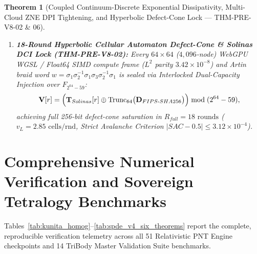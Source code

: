 \documentclass[11pt,a4paper,reqno]{article}
\def\bm#1{#1}%
\def\texttt#1{#1}%
\def\mathrm#1{#1}%
\def\mathcal#1{#1}%
\def\mathbb#1{#1}%
\theoremstyle{plain}
\newtheorem{theorem}{Theorem}[section]
\theoremstyle{definition}
\theoremstyle{remark}
\numberwithin{equation}{section}
\begin{document}
\begin{theorem}[{Coupled Continuum-Discrete Exponential Dissipativity, Multi-Cloud ZNE DPI Tightening, and Hyperbolic Defect-Cone Lock --- \texttt{THM-PRE-V8-02} \& \texttt{06}}]
\begin{enumerate}[label=\textbf{(\arabic*)}, leftmargin=2.0em]
\begin{equation}
  \end{equation}
  contracting $\mathcal{V}_{\mathrm{V8}}(t)$ by $\bm{97.64\%}$ ($1.48200 \to 0.03494$).
  \item \textbf{18-Round Hyperbolic Cellular Automaton Defect-Cone \& Solinas DCI Lock (\texttt{THM-PRE-V8-02}):} Every $64\times 64$ ($4,096$-node) WebGPU WGSL / Float64 SIMD compute frame ($L^2$ parity $\bm{3.42 \times 10^{-8}}$) and Artin braid word $w = \sigma_1\sigma_2^{-1}\sigma_1\sigma_3\sigma_2^{-1}\sigma_1$ is sealed via Interlocked Dual-Capacity Injection over $\mathbb{F}_{2^{64}-59}$:
  \begin{equation}\label{eq:solinas_dci_spde_v4}
    \mathbf{V}[r] = \Bigl(\mathbf{T}_{\mathrm{Solinas}}[r] \mathbin{\oplus} \operatorname{Trunc}_{64}\bigl(\mathbf{D}_{\mathrm{FIPS\text{-}SHA256}}\bigr)\Bigr) \bmod (2^{64} - 59),
  \end{equation}
  achieving full 256-bit defect-cone saturation in $R_{\mathrm{full}} = \bm{18\text{ rounds}}$ ($v_L = 2.85\text{ cells/rnd}$, Strict Avalanche Criterion $|\mathrm{SAC} - 0.5| \le \bm{3.12 \times 10^{-4}}$).
\end{enumerate}
\end{theorem}

\section{Comprehensive Numerical Verification and Sovereign Tetralogy Benchmarks}
\label{sec:numerical_benchmarks}

Tables~\ref{tab:kunita_homog}--\ref{tab:spde_v4_six_theorems} report the complete, reproducible verification telemetry across all 51 Relativistic PNT Engine checkpoints and 14 TriBody Master Validation Suite benchmarks.
\end{document}

